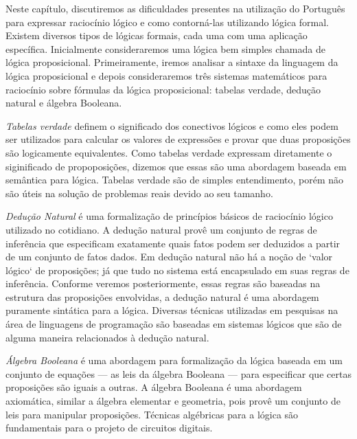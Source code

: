 Neste cap\'itulo, discutiremos as dificuldades presentes na utiliza\c{c}\~ao do Portugu\^es para expressar racioc\'inio
l\'ogico e como contorn\'a-las utilizando l\'ogica formal. Existem diversos tipos de l\'ogicas formais, cada uma com
uma aplica\c{c}\~ao espec\'ifica. Inicialmente consideraremos uma l\'ogica bem simples chamada de l\'ogica proposicional.
Primeiramente, iremos analisar a sintaxe da linguagem da l\'ogica proposicional e depois consideraremos tr\^es sistemas
matem\'aticos para racioc\'inio sobre f\'ormulas da l\'ogica proposicional: tabelas verdade, dedu\c{c}\~ao natural e \'algebra
Booleana.

\emph{Tabelas verdade} definem o significado dos conectivos l\'ogicos e como eles podem ser utilizados para calcular os
valores de express\~oes e provar que duas proposi\c{c}\~oes s\~ao logicamente equivalentes. Como tabelas verdade
expressam diretamente o siginificado de propoposi\c{c}\~oes, dizemos que essas s\~ao uma abordagem baseada em sem\^antica para l\'ogica.
Tabelas verdade s\~ao de simples entendimento, por\'em n\~ao s\~ao \'uteis na solu\c{c}\~ao de problemas reais devido ao seu tamanho.

\emph{Dedu\c{c}\~ao Natural} \'e uma formaliza\c{c}\~ao de princ\'ipios b\'asicos de racioc\'inio l\'ogico utilizado no cotidiano.
A dedu\c{c}\~ao natural prov\^e um conjunto de regras de infer\^encia que especificam exatamente quais fatos podem ser deduzidos
a partir de um conjunto de fatos dados. Em dedu\c{c}\~ao natural n\~ao h\'a a no\c{c}\~ao de `valor l\'ogico` de proposi\c{c}\~oes;
j\'a que tudo no sistema est\'a encapsulado em suas regras de infer\^encia. Conforme veremos posteriormente, essas regras s\~ao baseadas
na estrutura das proposi\c{c}\~oes envolvidas, a dedu\c{c}\~ao natural \'e uma abordagem puramente sint\'atica para a l\'ogica. Diversas
t\'ecnicas utilizadas em pesquisas na \'area de linguagens de programa\c{c}\~ao s\~ao baseadas em sistemas l\'ogicos que s\~ao de alguma
maneira relacionados \`a dedu\c{c}\~ao natural.

\emph{\'Algebra Booleana} \'e uma abordagem para formaliza\c{c}\~ao da l\'ogica baseada em um conjunto de equa\c{c}\~oes --- as leis
da \'algebra Booleana --- para especificar que certas proposi\c{c}\~oes s\~ao iguais a outras. A \'algebra Booleana \'e uma abordagem
axiom\'atica, similar a \'algebra elementar e geometria, pois prov\^e um conjunto de leis para manipular proposi\c{c}\~oes. T\'ecnicas
alg\'ebricas para a l\'ogica s\~ao fundamentais para o projeto de circuitos digitais.

